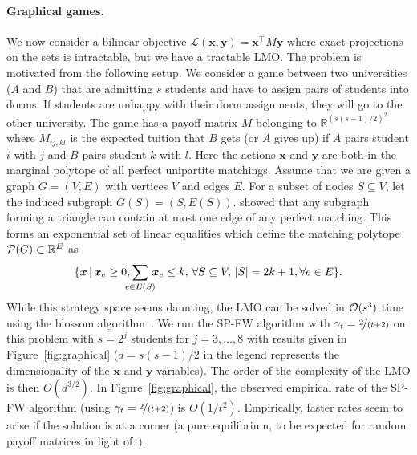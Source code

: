 \documentclass[twoside]{article}
\newcommand{\R}{\mathbb{R}}
\renewcommand{\L}{\mathcal{L}}
\newcommand{\x}{\bm{x}}
\newcommand{\y}{\bm{y}}
\newcommand{\stepsize}{\gamma}
\newcommand{\0}{\mathbf{0}} %
\begin{document}
\paragraph{Graphical games.} We now consider a bilinear objective $\L(\x,\y) = \x^\top M\y$ where exact projections on the sets is intractable, but we have a tractable LMO. The problem is motivated from the following setup. We consider a game between 
two universities ($A$ and $B$) that are admitting $s$ students and have to assign pairs of students into dorms.
If students are unhappy with their dorm assignments, they will go to the other university. The game has a payoff matrix $M$ belonging to $\R^{(s(s-1)/2)^2}$ where $M_{ij,kl}$ is the expected tuition that $B$ gets (or $A$ gives up) if $A$ pairs student $i$ with $j$ and $B$ pairs student $k$ with $l$.
Here the actions $\x$ and $\y$ are both in the marginal polytope of all perfect unipartite matchings. Assume that we are given a graph $G=(V,E)$ with vertices $V$ and edges $E$. For a subset of nodes $S \subseteq V$, let the induced subgraph $G(S)=(S,E(S))$. \citet{edmonds1965} showed that any subgraph forming a triangle can contain at most one edge of any perfect matching. This forms an exponential set of linear equalities which define the matching polytope ${\cal P}(G) \subset \mathbb{R}^E $ as
\begingroup
\setlength{\thinmuskip}{1.3mu}
\setlength{\medmuskip}{1.3mu}
\setlength{\thickmuskip}{1.3mu}
\begin{equation} 
\{ \x \,| \, \x_e \geq 0, \hspace{-2.1mm} %
\sum_{e \in E(S)}\hspace{-1.7mm} \x_e \leq k, \, \forall S \subseteq V,\, { |S|=2 k+1 },\forall e \in E \}.
\end{equation}
\endgroup
While this strategy space seems daunting, the LMO can be solved in ${\cal O}(s^3)$ time using the blossom algorithm~\citep{edmonds1965}. We run the SP-FW algorithm with $\stepsize_t = \nicefrac{2}{(t+2)}$ on this problem with $s = 2^j$ students for $j=3, \ldots, 8$ with results given in Figure~\ref{fig:graphical} ($d=s(s-1)/2$ in the legend represents the dimensionality of the $\x$ and $\y$ variables). The order of the complexity of the LMO is then $O(d^{3/2})$.
In Figure~\ref{fig:graphical}, the observed empirical rate of the SP-FW algorithm (using $\stepsize_t = \nicefrac{2}{(t+2)}$) is $O(1/t^2)$. Empirically, faster rates seem to arise if the solution is at a corner (a pure equilibrium, to be expected for random payoff matrices in light of~\citep{barany2007nash}).
\end{document}
